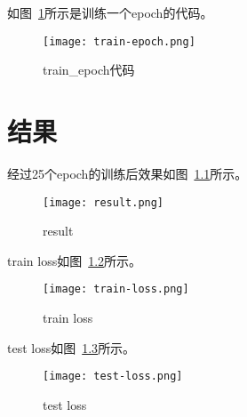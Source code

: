 \documentclass[UTF8]{ctexrep}
\begin{document}
如图~\ref{fig:train-epoch}所示是训练一个epoch的代码。

\begin{figure}[htbp]
    \centering
    \texttt{[image: train-epoch.png]}
    \caption{train\_epoch代码}
    \label{fig:train-epoch}
\end{figure}

\chapter{结果}
经过25个epoch的训练后效果如图~\ref{fig:result}所示。
\begin{figure}
    \centering
    \texttt{[image: result.png]}
    \caption{result}
    \label{fig:result}
\end{figure}

\graphicspath{{../}}
train loss如图~\ref{fig:train-loss}所示。
\begin{figure}
    \centering
    \texttt{[image: train-loss.png]}
    \caption{train loss}
    \label{fig:train-loss}
\end{figure}

test loss如图~\ref{fig:test-loss}所示。
\begin{figure}
    \centering
    \texttt{[image: test-loss.png]}
    \caption{test loss}
    \label{fig:test-loss}
\end{figure}



\end{document}
